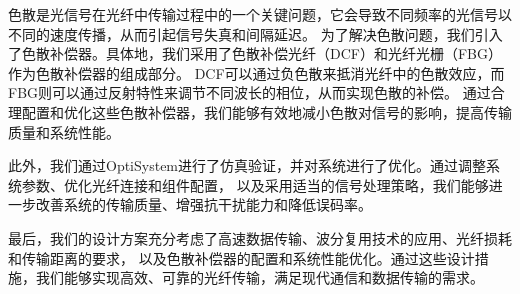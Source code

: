 \documentclass[12pt]{article}
\begin{document}
色散是光信号在光纤中传输过程中的一个关键问题，它会导致不同频率的光信号以不同的速度传播，从而引起信号失真和间隔延迟。
为了解决色散问题，我们引入了色散补偿器。具体地，我们采用了色散补偿光纤（DCF）和光纤光栅（FBG）作为色散补偿器的组成部分。
DCF可以通过负色散来抵消光纤中的色散效应，而FBG则可以通过反射特性来调节不同波长的相位，从而实现色散的补偿。
通过合理配置和优化这些色散补偿器，我们能够有效地减小色散对信号的影响，提高传输质量和系统性能。

此外，我们通过OptiSystem进行了仿真验证，并对系统进行了优化。通过调整系统参数、优化光纤连接和组件配置，
以及采用适当的信号处理策略，我们能够进一步改善系统的传输质量、增强抗干扰能力和降低误码率。

最后，我们的设计方案充分考虑了高速数据传输、波分复用技术的应用、光纤损耗和传输距离的要求，
以及色散补偿器的配置和系统性能优化。通过这些设计措施，我们能够实现高效、可靠的光纤传输，满足现代通信和数据传输的需求。
\clearpage










\pagestyle{headings}


\end{document}
